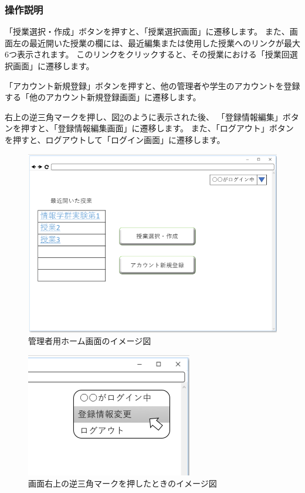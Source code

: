 \subsubsection{操作説明}
「授業選択・作成」ボタンを押すと、「授業選択画面」に遷移します。
また、画面左の最近開いた授業の欄には、最近編集または使用した授業へのリンクが最大6つ表示されます。
このリンクをクリックすると、その授業における「授業回選択画面」に遷移します。

「アカウント新規登録」ボタンを押すと、他の管理者や学生のアカウントを登録する「他のアカウント新規登録画面」に遷移します。

右上の逆三角マークを押し、図\ref{fig:05}のように表示された後、
「登録情報編集」ボタンを押すと、「登録情報編集画面」に遷移します。
また、「ログアウト」ボタンを押すと、ログアウトして「ログイン画面」に遷移します。



\begin{figure}[phtbp]
  \begin{center}
    \includegraphics[width=0.8\linewidth,clip]{./img/04.png}
    \caption{管理者用ホーム画面のイメージ図}\label{fig:04}
  \end{center}
\end{figure}

\begin{figure}[phtbp]
  \begin{center}
    \includegraphics[width=0.3\linewidth,clip]{./img/05_.png}
    \caption{画面右上の逆三角マークを押したときのイメージ図}\label{fig:05}
  \end{center}
\end{figure}

